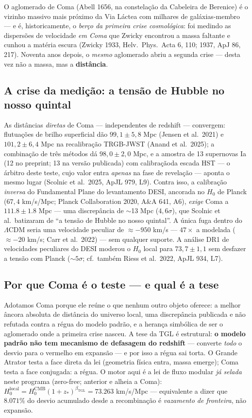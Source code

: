 \documentclass[11pt]{article}
\newcommand{\bTGL}{\beta_{\mathrm{TGL}}}\newcommand{\Msun}{M_{\odot}}\newcommand{\TGL}{\mathrm{TGL}}
\theoremstyle{definition}\newtheorem{deriv}{Derivação}
\begin{document}
O aglomerado de Coma (Abell 1656, na constelação da Cabeleira de Berenice) é o vizinho massivo mais próximo da Via Láctea com milhares de galáxias-membro --- e é, historicamente, o \emph{berço da primeira crise cosmológica}: foi medindo as dispersões de velocidade \emph{em Coma} que Zwicky encontrou a massa faltante e cunhou a matéria escura (Zwicky 1933, Helv.\ Phys.\ Acta 6, 110; 1937, ApJ 86, 217). Noventa anos depois, o \emph{mesmo} aglomerado abriu a segunda crise --- desta vez não a massa, mas a \textbf{distância}.

\subsection*{A crise da medição: a tensão de Hubble no nosso quintal}

As distâncias \emph{diretas} de Coma --- independentes de redshift --- convergem: flutuações de brilho superficial dão $99{,}1\pm5{,}8$ Mpc (Jensen et al.\ 2021) e $101{,}2\pm6{,}4$ Mpc na recalibração TRGB-JWST (Anand et al.\ 2025); a combinação de três métodos dá $98{,}0\pm2{,}0$ Mpc, e a amostra de 13 supernovas Ia (12 no preprint; 13 na versão publicada) com calibraçãoda escada HST --- o árbitro deste teste, cujo valor entra \emph{apenas} na fase de revelação --- aponta o mesmo lugar (Scolnic et al.\ 2025, ApJL 979, L9). Contra isso, a calibração \emph{inversa} do Fundamental Plane do levantamento DESI, ancorada no $H_0$ de Planck ($67{,}4$ km/s/Mpc; Planck Collaboration 2020, A\&A 641, A6), \emph{exige} Coma a $111.8\pm1.8$ Mpc --- uma discrepância de $\sim$13 Mpc ($4{,}6\sigma$), que Scolnic et al.\ batizaram de ``a tensão de Hubble no nosso quintal''. A única fuga dentro do $\Lambda$CDM seria uma velocidade peculiar de $\approx-950$ km/s --- $47\times$ a modelada ($\approx-20$ km/s; Carr et al.\ 2022) --- sem qualquer suporte. A análise DR1 de velocidades peculiares do DESI moderou o $H_0$ local para $73{,}7\pm1{,}1$ sem desfazer a tensão com Planck ($\sim5\sigma$; cf.\ também Riess et al.\ 2022, ApJL 934, L7).

\subsection*{Por que Coma é o teste --- e qual é a tese}

Adotamos Coma porque ele reúne o que nenhum outro objeto oferece: a melhor âncora absoluta de distância do universo local, uma discrepância publicada e não refutada contra a régua do modelo padrão, e a herança simbólica de ser o aglomerado onde a primeira crise nasceu. A tese da TGL é estrutural: \textbf{o modelo padrão não tem mecanismo de defasagem do redshift} --- converte \emph{todo} o desvio para o vermelho em expansão --- e por isso a régua sai torta. O Grande Atrator testa a face direta da lei (geometria física entra, massa emerge); Coma testa a face conjugada: a régua. O motor aqui é a lei de fluxo modular \emph{já selada} neste programa (zero-free; anterior e alheia a Coma): $H_0^{\mathrm{local}}=H_0^{\mathrm{CMB}}(1+z_*)^{\bTGL}=73.263$ km/s/Mpc --- equivalente a dizer que $8.071\%$ do desvio acumulado desde a recombinação é \emph{vazamento de fronteira}, não expansão.
\end{document}
